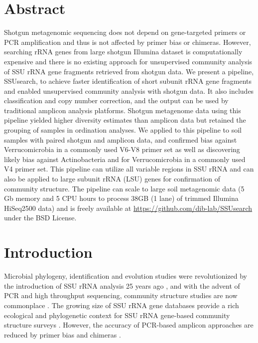 \documentclass[]{msu-thesis}
\begin{document}
\section{Abstract}
Shotgun metagenomic sequencing does not depend on gene-targeted primers or PCR amplification and thus is not affected by primer bias or chimeras. However, searching rRNA genes from large shotgun Illumina dataset is computationally expensive and there is no existing approach for unsupervised community analysis of SSU rRNA gene fragments retrieved from shotgun data. We present a pipeline, SSUsearch, to achieve faster identification of short subunit rRNA gene fragments and enabled unsupervised community analysis with shotgun data. It also includes classification and copy number correction, and the output can be used by traditional amplicon analysis platforms. Shotgun metagenome data using this pipeline yielded higher diversity estimates than amplicon data but retained the grouping of samples in ordination analyses. We applied to this pipeline to soil samples with paired shotgun and amplicon data, and confirmed bias against Verrucomicrobia in a commonly used V6-V8 primer set as well as discovering likely bias against Actinobacteria and for Verrucomicrobia in a commonly used V4 primer set. This pipeline can utilize all variable regions in SSU rRNA and can also be applied to large subunit rRNA (LSU) genes for confirmation of community structure. The pipeline can scale to large soil metagenomic data (5 Gb memory and 5 CPU hours to process 38GB (1 lane) of trimmed Illumina HiSeq2500 data) and is freely available at \url{https://github.com/dib-lab/SSUsearch} under the BSD License.

\section{Introduction}

Microbial phylogeny, identification and evolution studies were revolutionized by the introduction of SSU rRNA analysis 25 years ago \cite{lane_rapid_1985}, and with the advent of PCR and high throughput sequencing, community structure studies are now commonplace \cite{streit_metagenomicskey_2004,huse_exploring_2008,caporaso_ultra-high-throughput_2012,sogin_microbial_2006}. The growing size of SSU rRNA gene databases provide a rich ecological and phylogenetic context for SSU rRNA gene-based community structure surveys \cite{cole_ribosomal_2009,quast_silva_2013}. However, the accuracy of PCR-based amplicon approaches are reduced by primer bias and chimeras \cite{bergmann_under-recognized_2011,haas_chimeric_2011}.
\end{document}
